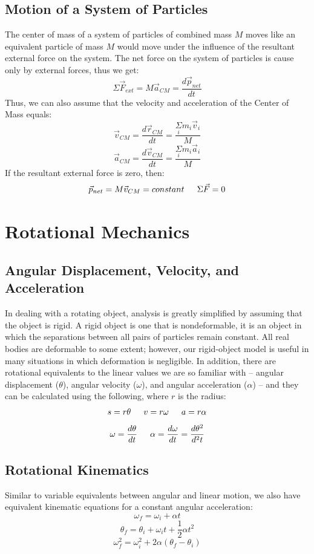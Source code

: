 \documentclass{article}
\begin{document}
	\subsection{Motion of a System of Particles}
    	The center of mass of a system of particles of combined mass $M$ moves like an equivalent particle of mass $M$ would move under the influence of the resultant external force on the system. The net force on the system of particles is cause only by external forces, thus we get:
        \[
        	\Sigma\vec{F}_{ext}=M\vec{a}_{CM}=\frac{d\vec{p}_{net}}{dt}
        \]
        Thus, we can also assume that the velocity and acceleration of the Center of Mass equals:
        \[
        	\vec{v}_{CM}=\frac{d\vec{r}_{CM}}{dt}=\frac{\underset{i}{\Sigma}m_i\vec{v}_i}{M}
        \]
        \[
        	\vec{a}_{CM}=\frac{d\vec{v}_{CM}}{dt}=\frac{\underset{i}{\Sigma}m_i\vec{a}_i}{M}
        \]
        If the resultant external force is zero, then:
        \[
        	\vec{p}_{net}=M\vec{v}_{CM}=constant \indent
            \Sigma\vec{F}=0
        \]
        
\section{Rotational Mechanics}
	\subsection{Angular Displacement, Velocity, and Acceleration}
    	In dealing with a rotating object, analysis is greatly simplified by assuming that the object is rigid. A rigid object is one that is nondeformable, it is an object in which the separations between all pairs of particles remain constant. All real bodies are deformable to some extent; however, our rigid-object model is useful in many situations in which deformation is negligible. In addition, there are rotational equivalents to the linear values we are so familiar with -- angular displacement ($\theta$), angular velocity ($\omega$), and angular acceleration ($\alpha$) -- and they can be calculated using the following, where $r$ is the radius:
        \[
        	s=r\theta \indent
            v=r\omega \indent
            a=r\alpha
        \]
        \[
        	\omega=\frac{d\theta}{dt} \indent
            \alpha=\frac{d\omega}{dt}=\frac{d\theta^2}{d^2t}
        \]
        
	\subsection{Rotational Kinematics}
    	Similar to variable equivalents between angular and linear motion, we also have equivalent kinematic equations for a constant angular acceleration:
        \[
        	\omega_f=\omega_i+\alpha t
        \]
        \[
        	\theta_f=\theta_i+\omega_it+\frac{1}{2}\alpha t^2
        \]
        \[
        	\omega_f^2=\omega_i^2+2\alpha(\theta_f-\theta_i)
        \]
\end{document}

